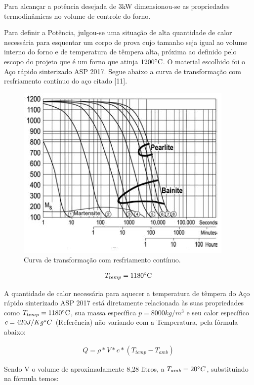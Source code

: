Para alcançar a potência desejada de 3kW dimensionou-se as propriedades termodinâmicas no volume de controle do forno.

Para definir a Potência, julgou-se uma situação de alta quantidade de calor necessária para esquentar um corpo de prova cujo tamanho seja igual ao volume interno do forno e de temperatura de têmpera alta, próxima ao definido pelo escopo do projeto que é um forno que atinja $1200 \degree \text{C}$. O material escolhido foi o Aço rápido sinterizado ASP 2017. Segue abaixo a curva de transformação com resfriamento contínuo do aço citado [11].
\begin{figure}[!ht]
	\centering
	\label{transf_continuo}
	\includegraphics[keepaspectratio=true,scale=0.8]{figuras/transf_continuo.JPG}
	\caption{Curva de transformação com resfriamento contínuo.}
\end{figure}

\begin{align}
	T_{temp} = 1180 \degree \text{C}
\end{align}

A quantidade de calor necessária para aquecer a temperatura de têmpera do Aço rápido sinterizado ASP 2017 está diretamente relacionada às suas propriedades como $T_{temp} = 1180 \degree \text{C}$, sua massa específica $p = 8000 kg/m^{3}$ e seu calor específico $c = 420 J/Kg \degree C$ (Referência) não variando com a Temperatura, pela fórmula abaixo:

\begin{align}
	Q = \rho * V * c * (T_{temp} - T_{amb})
\end{align}

Sendo V o volume de aproximadamente 8,28 litros, a $T_{amb}=20 \degree C$, substituindo na fórmula temos:

